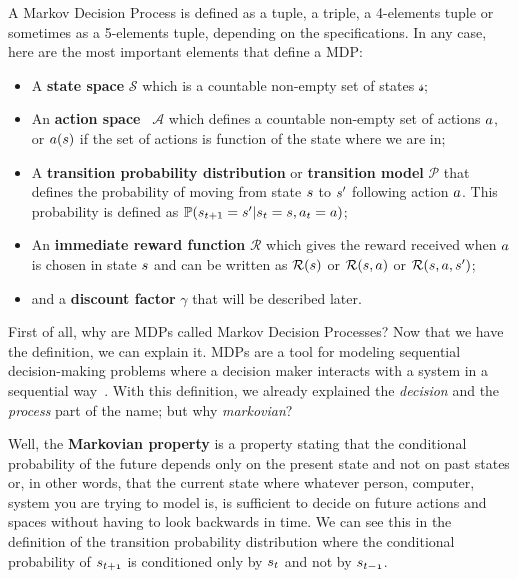 A Markov Decision Process is defined as a tuple, a triple, a 4-elements tuple or sometimes as a 5-elements tuple, depending on the specifications. In any case, here are the most important elements that define a MDP:
\begin{itemize}
    \item A \textbf{state space} $\mathcal{S}$ which is a countable non-empty set of states $\mathcal{s}$;
    \item An \textbf{action space}  $\mathcal{A}$ which defines a countable non-empty set of actions $\mathnormal{a}$, or $\mathnormal{a(s)}$ if the set of actions is function of the state where we are in;
    \item A \textbf{transition probability distribution} or \textbf{transition model} $\mathcal{P}$ that defines the probability of moving from state $\mathnormal{s}$ to $\mathnormal{s'}$ following action $\mathnormal{a}$. This probability is defined as $\mathbb{P}(s_{t+1} = \mathnormal{s'} \vert s_t = \mathnormal{s}, a_t = \mathnormal{a})$;
    \item An \textbf{immediate reward function} $\mathcal{R}$ which gives the reward received when $\mathnormal{a}$ is chosen in state $\mathnormal{s}$ and can be written as $\mathcal{R}(\mathnormal{s})$ or $\mathcal{R}(\mathnormal{s, a})$ or $\mathcal{R}(\mathnormal{s, a, s'})$;
    \item and a \textbf{discount factor} $\mathcal{\gamma}$ that will be described later.
\end{itemize}

First of all, why are MDPs called Markov Decision Processes? Now that we have the definition, we can explain it. MDPs are a tool for modeling sequential decision-making problems where a decision maker interacts with a system in a sequential way~\cite{RLAlgs}. With this definition, we already explained the \textit{decision} and the \textit{process} part of the name; but why \textit{markovian}?

Well, the \textbf{Markovian property} is a property stating that the conditional probability of the future depends only on the present state and not on past states or, in other words, that the current state where whatever person, computer, system you are trying to model is, is sufficient to decide on future actions and spaces without having to look backwards in time. We can see this in the definition of the transition probability distribution where the conditional probability of $\mathnormal{s_{t+1}}$ is conditioned only by $\mathnormal{s_t}$ and not by $\mathnormal{s_{t-1}}$.


